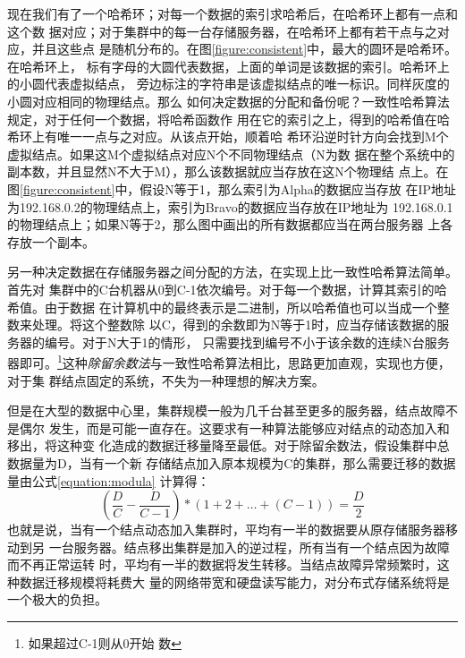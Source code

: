 现在我们有了一个哈希环；对每一个数据的索引求哈希后，在哈希环上都有一点和这个数
据对应；对于集群中的每一台存储服务器，在哈希环上都有若干点与之对应，并且这些点
是随机分布的。在图\ref{figure:consistent}中，最大的圆环是哈希环。在哈希环上，
标有字母的大圆代表数据，上面的单词是该数据的索引。哈希环上的小圆代表虚拟结点，
旁边标注的字符串是该虚拟结点的唯一标识。同样灰度的小圆对应相同的物理结点。那么
如何决定数据的分配和备份呢？一致性哈希算法规定，对于任何一个数据，将哈希函数作
用在它的索引之上，得到的哈希值在哈希环上有唯一一点与之对应。从该点开始，顺着哈
希环沿逆时针方向会找到M个虚拟结点。如果这M个虚拟结点对应N个不同物理结点（N为数
据在整个系统中的副本数，并且显然N不大于M），那么该数据就应当存放在这N个物理结
点上。在图\ref{figure:consistent}中，假设N等于1，那么索引为Alpha的数据应当存放
在IP地址为192.168.0.2的物理结点上，索引为Bravo的数据应当存放在IP地址为
192.168.0.1的物理结点上；如果N等于2，那么图中画出的所有数据都应当在两台服务器
上各存放一个副本。

另一种决定数据在存储服务器之间分配的方法，在实现上比一致性哈希算法简单。首先对
集群中的C台机器从0到C-1依次编号。对于每一个数据，计算其索引的哈希值。由于数据
在计算机中的最终表示是二进制，所以哈希值也可以当成一个整数来处理。将这个整数除
以C，得到的余数即为N等于1时，应当存储该数据的服务器的编号。对于N大于1的情形，
只需要找到编号不小于该余数的连续N台服务器即可。\footnote{如果超过C-1则从0开始
数}这种\emph{除留余数法}与一致性哈希算法相比，思路更加直观，实现也方便，对于集
群结点固定的系统，不失为一种理想的解决方案。

但是在大型的数据中心里，集群规模一般为几千台甚至更多的服务器，结点故障不是偶尔
发生，而是可能一直存在。这要求有一种算法能够应对结点的动态加入和移出，将这种变
化造成的数据迁移量降至最低。对于除留余数法，假设集群中总数据量为D，当有一个新
存储结点加入原本规模为C的集群，那么需要迁移的数据量由公式\ref{equation:modula}
计算得：
\begin{equation}\label{equation:modula}
(\frac{D}{C} - \frac{D}{C - 1}) * (1 + 2 + \dots + (C - 1)) = \frac{D}{2}
\end{equation}
也就是说，当有一个结点动态加入集群时，平均有一半的数据要从原存储服务器移动到另
一台服务器。结点移出集群是加入的逆过程，所有当有一个结点因为故障而不再正常运转
时，平均有一半的数据将发生转移。当结点故障异常频繁时，这种数据迁移规模将耗费大
量的网络带宽和硬盘读写能力，对分布式存储系统将是一个极大的负担。

